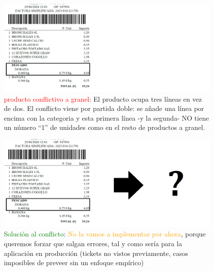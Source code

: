 \documentclass{beamer}
\begin{document}
	
	\begin{frame}
		\begin{figure}
			\centering
			\includegraphics[width=1\linewidth]{imgEspecifiques/ticketExtraccioR}
			\caption{\textcolor{red}{producto conflictivo a granel}: El producto ocupa tres líneas en vez de dos. El conflicto viene por partida doble: se añade una línea por encima con la categoria y esta primera línea -y la segunda- NO tiene un número ``1'' de unidades como en el resto de productos a granel. }
			\label{fig:ticketextraccioR}
		\end{figure}
	\end{frame}
	
	
	\begin{frame}
		\begin{figure}
			\centering
			\includegraphics[width=1\linewidth]{imgEspecifiques/ticketExtraccioS}
			\caption{\textcolor{green}{Solución al conflicto}: \textcolor{orange}{No la vamos a implementar por ahora}, porque queremos forzar que salgan errores, tal y como sería para la aplicación en producción (tickets no vistos previamente, casos imposibles de preveer sin un enfoque empírico)}
			\label{fig:ticketextraccioS}
		\end{figure}
	\end{frame}
	
\end{document}
